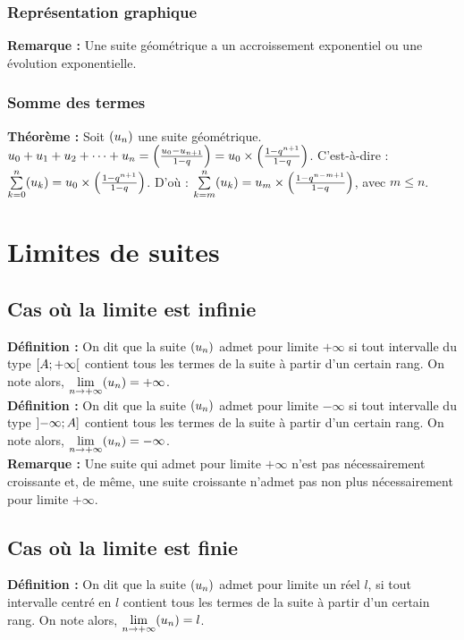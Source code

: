\documentclass[a4paper,titlepage]{article}
\let\oldsection\section
\renewcommand\section{\clearpage\oldsection}
\let\oldleft\left
\renewcommand{\left}{\mathopen{}\mathclose\bgroup\oldleft}
\let\oldright\right
\renewcommand{\right}{\aftergroup\egroup\oldright}
\begin{document}
        \subsubsection{Représentation graphique}
            \textbf{Remarque :} Une suite géométrique a un accroissement exponentiel ou une évolution exponentielle.
        \subsubsection{Somme des termes}
            \textbf{Théorème :} Soit $\left(u_{n}\right)$ une suite géométrique. $u_{0}+u_{1}+u_{2}+\cdots+u_{n}=\left(\frac{u_{0}-u_{n+1}}{1-q}\right)=u_{0}\times\left(\frac{1-q^{n+1}}{1-q}\right)$. C’est-à-dire : $\sum\limits_{k=0}^{n}\left(u_{k}\right)=u_{0}\times\left(\frac{1-q^{n+1}}{1-q}\right)$. D’où : $\sum\limits_{k=m}^{n}\left(u_{k}\right)=u_{m}\times\left(\frac{1-q^{n-m+1}}{1-q}\right)$, avec $m\leqslant n$.
\section{Limites de suites}
    \subsection{Cas où la limite est infinie}
        \textbf{Définition :} On dit que la suite $\left(u_{n}\right)$ admet pour limite $+\infty$ si tout intervalle du type $\left[A;+\infty\right[$ contient tous les termes de la suite à partir d’un certain rang. On note alors, $\lim\limits_{n\to+\infty}\left(u_{n}\right)=+\infty$.
        \\
        \textbf{Définition :} On dit que la suite $\left(u_{n}\right)$ admet pour limite $-\infty$ si tout intervalle du type $\left]-\infty;A\right]$ contient tous les termes de la suite à partir d’un certain rang. On note alors, $\lim\limits_{n\to+\infty}\left(u_{n}\right)=-\infty$.
        \\
        \textbf{Remarque :} Une suite qui admet pour limite $+\infty$ n’est pas nécessairement croissante et, de même, une suite croissante n’admet pas non plus nécessairement pour limite $+\infty$.
    \subsection{Cas où la limite est finie}
        \textbf{Définition :} On dit que la suite $\left(u_{n}\right)$ admet pour limite un réel $l$, si tout intervalle centré en $l$ contient tous les termes de la suite à partir d’un certain rang. On note alors, $\lim\limits_{n\to+\infty}\left(u_{n}\right)=l$.
\end{document}

